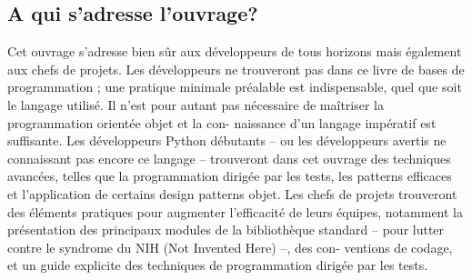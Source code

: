 \subsection*{A qui s'adresse l'ouvrage?}
Cet ouvrage s’adresse bien sûr aux développeurs de tous horizons mais également aux
chefs de projets.
Les développeurs ne trouveront pas dans ce livre de bases de programmation ; une
pratique minimale préalable est indispensable, quel que soit le langage utilisé. Il n’est
pour autant pas nécessaire de maîtriser la programmation orientée objet et la con-
naissance d’un langage impératif est suffisante.
Les développeurs Python débutants – ou les développeurs avertis ne connaissant pas
encore ce langage – trouveront dans cet ouvrage des techniques avancées, telles que la
programmation dirigée par les tests, les patterns efficaces et l’application de certains
design patterns objet.
Les chefs de projets trouveront des éléments pratiques pour augmenter l’efficacité de
leurs équipes, notamment la présentation des principaux modules de la bibliothèque
standard – pour lutter contre le syndrome du NIH (Not Invented Here) –, des con-
ventions de codage, et un guide explicite des techniques de programmation dirigée
par les tests.

